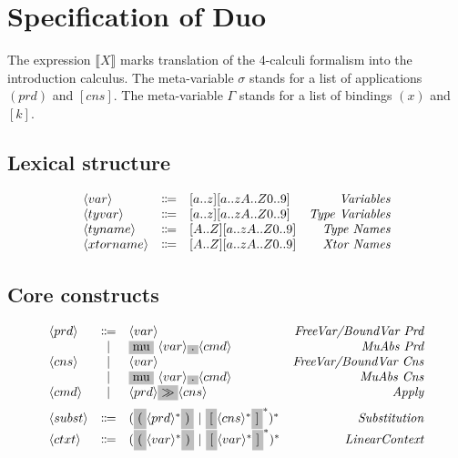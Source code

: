 \documentclass[11pt]{article}
\newcommand{\translate}[1]{\llbracket #1 \rrbracket}
\newcommand{\nonterminal}[1]{\langle #1 \rangle}
\newcommand{\terminal}[1]{\colorbox{lightgray}{#1}}
\begin{document}
\section{Specification of Duo}

The expression $\translate{X}$ marks translation of the 4-calculi formalism into the introduction calculus.
The meta-variable $\sigma$ stands for a list of applications $(prd)$ and $[cns]$.
The meta-variable $\Gamma$ stands for a list of bindings $(x)$ and $[k]$.

\subsection{Lexical structure}
\[
  \begin{array}{lclr}
    \nonterminal{var} & \Coloneqq & [a..z][a..zA..Z0..9] & \emph{Variables} \\
    \nonterminal{tyvar} & \Coloneqq & [a..z][a..zA..Z0..9] & \emph{Type Variables} \\
    \nonterminal{tyname} & \Coloneqq & [A..Z][a..zA..Z0..9] & \emph{Type Names} \\
    \nonterminal{xtorname} & \Coloneqq & [A..Z][a..zA..Z0..9] & \emph{Xtor Names} \\
  \end{array}
\]

\subsection{Core constructs}
\[
  \begin{array}{lclr}
    \nonterminal{prd} & \Coloneqq & \nonterminal{var} & \emph{FreeVar/BoundVar Prd} \\
    & | & \terminal{mu}\ \nonterminal{var} \terminal{.} \nonterminal{cmd} & \textit{MuAbs Prd} \\
    \nonterminal{cns} & | & \nonterminal{var} & \textit{FreeVar/BoundVar Cns} \\
    & | & \terminal{mu}\ \nonterminal{var} \terminal{.} \nonterminal{cmd} & \textit{MuAbs Cns} \\
    \nonterminal{cmd} & | & \nonterminal{prd} \terminal{$\gg$} \nonterminal{cns} & \textit{Apply} \\[0.2cm]
    \nonterminal{subst} & \Coloneqq & (\terminal{(}\nonterminal{prd}^{\ast}\terminal{)}\ |\ \terminal{[}\nonterminal{cns}^{\ast}\terminal{]}^{\ast})^{\ast} & \emph{Substitution} \\
    \nonterminal{ctxt} & \Coloneqq & (\terminal{(}\nonterminal{var}^{\ast}\terminal{)}\ |\ \terminal{[}\nonterminal{var}^{\ast}\terminal{]}^{\ast})^{\ast} & \emph{LinearContext}
  \end{array}
\]
\end{document}
